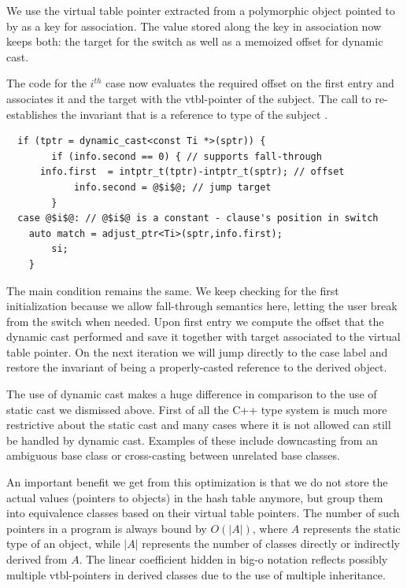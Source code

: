 \noindent
We use the virtual table pointer extracted from a polymorphic object pointed to 
by  as a key for association. The value stored along the key in 
association now keeps both: the target for the switch as well as a memoized 
offset for dynamic cast. 

The code for the $i^{th}$ case now evaluates the required offset on the first 
entry and associates it and the target with the vtbl-pointer of the subject.
The call to  re-establishes the invariant that 
 is a reference to type  of the subject .

\begin{lstlisting}
  if (tptr = dynamic_cast<const Ti *>(sptr)) {
        if (info.second == 0) { // supports fall-through
      info.first  = intptr_t(tptr)-intptr_t(sptr); // offset
            info.second = @$i$@; // jump target
        }
  case @$i$@: // @$i$@ is a constant - clause's position in switch
    auto match = adjust_ptr<Ti>(sptr,info.first);
        si;
    }
\end{lstlisting}

\noindent
The main condition remains the same. We keep checking for the first initialization 
because we allow fall-through semantics here, letting the user break from the 
switch when needed. Upon first entry we compute the offset that the dynamic cast 
performed and save it together with target associated to the virtual table 
pointer. On the next iteration we will jump directly to the case label and 
restore the invariant of  being a properly-casted reference to the 
derived object.

The use of dynamic cast makes a huge difference in comparison to the use of 
static cast we dismissed above. First of all the C++ type system is much more 
restrictive about the static cast and many cases where it is not allowed can 
still be handled by dynamic cast. Examples of these include downcasting from an 
ambiguous base class or cross-casting between unrelated base classes.

An important benefit we get from this optimization is that we do not store the 
actual values (pointers to objects) in the hash table anymore, but group them 
into equivalence classes based on their virtual table pointers. The number of 
such pointers in a program is always bound by $O(|A|)$, where $A$ represents the 
static type of an object, while $|A|$ represents the number of classes directly 
or indirectly derived from $A$. The linear coefficient hidden in big-o notation 
reflects possibly multiple vtbl-pointers in derived classes due to the use of 
multiple inheritance.

